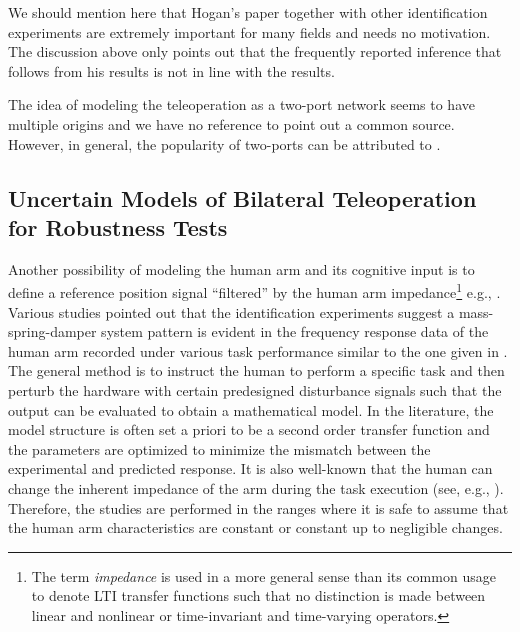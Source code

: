 We should mention here that Hogan's paper together with other identification experiments are extremely important for many
fields and needs no motivation. The discussion above only points out that the frequently reported inference that follows from 
his results is not in line with the results. 

The idea of modeling the teleoperation as a two-port network seems to have multiple origins and we have no reference to 
point out a common source. However, in general, the popularity of two-ports can be attributed to \cite{andersonspong,nieslotine,
rajuphd,hannaford89,yokokohjiyoshikawa}. 


\subsection{Uncertain Models of Bilateral Teleoperation for Robustness Tests}\label{sec:lit:uncmodel}

Another possibility of modeling the human arm and its cognitive input is to define a reference position signal \enquote{filtered} by the 
human arm impedance\footnote{The term \emph{impedance} is used in a more general sense than its common usage to denote
LTI transfer functions such that no distinction is made between linear and nonlinear or time-invariant and time-varying 
operators.} e.g., \cite{leelee,kazeroonitsay}. Various studies pointed out that the identification experiments suggest a 
mass-spring-damper system pattern is evident in the frequency response data of the human arm recorded under various task 
performance similar to the one given in \cite{hogan89}. The general method is to instruct the human to perform a specific 
task and then perturb the hardware with certain predesigned disturbance signals such that the output can be evaluated to obtain 
a mathematical model. In the literature, the model structure is often set a priori to be a second order transfer function and 
the parameters are optimized to minimize the mismatch between the experimental and predicted response. It is also well-known 
that the human can change the inherent impedance of the arm during the task execution (see, e.g., \cite{tsujimorasso}). 
Therefore, the studies are performed in the ranges where it is safe to assume that the human arm characteristics are constant 
or constant up to negligible changes. 



